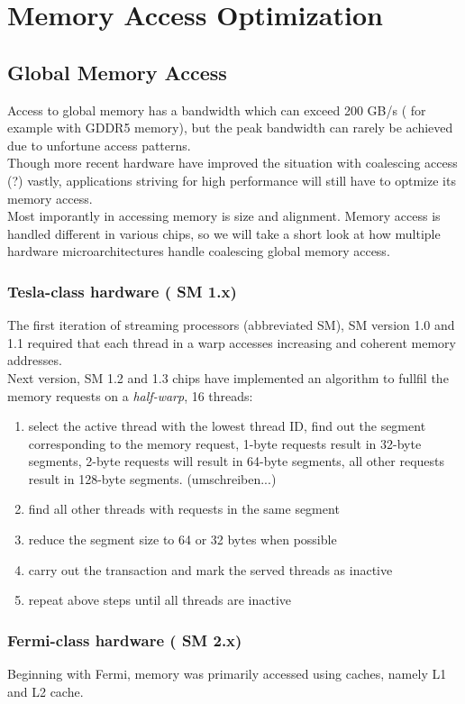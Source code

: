 \section{Memory Access Optimization}
\label{sec:access}
\subsection{Global Memory Access}
\label{sec:global}
Access to global memory has a bandwidth which can exceed 200 GB/s ( for example with GDDR5 memory), but the peak bandwidth can rarely be achieved due to unfortune access patterns.\\
Though more recent hardware have improved the situation with coalescing access (?) vastly, applications striving for high performance will still have to optmize its memory access.\\
Most imporantly in accessing memory is size and alignment.
Memory access is handled different in various chips, so we will take a short look at how multiple hardware microarchitectures handle coalescing global memory access.\\
\subsubsection{Tesla-class hardware ( SM 1.x)}
The first iteration of streaming processors (abbreviated SM), SM version 1.0 and 1.1 required that each thread in a warp accesses increasing and coherent memory addresses.\\ 
Next version, SM 1.2 and 1.3 chips have implemented an algorithm to fullfil the memory requests on a \emph{half-warp}, 16 threads:\\
\begin{enumerate}
    \item select the active thread with the lowest thread ID, find out the segment corresponding to the memory request, 1-byte requests result in 32-byte segments, 2-byte requests will result in 64-byte segments, all other requests result in 128-byte segments. (umschreiben...)
    \item find all other threads with requests in the same segment
    \item reduce the segment size to 64 or 32 bytes when possible
    \item carry out the transaction and mark the served threads as inactive
    \item repeat above steps until all threads are inactive
\end{enumerate}
\subsubsection{Fermi-class hardware ( SM 2.x)}
Beginning with Fermi, memory was primarily accessed using caches, namely L1 and L2 cache.\\
